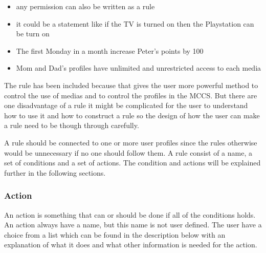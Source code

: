 \begin{itemize}
	\item any permission can also be written as a rule
	\item it could be a statement like if the TV is turned on then the Playstation can be turn on
	\item The first Monday in a month increase Peter's points by 100
	\item Mom and Dad's profiles have unlimited and unrestricted access to each media
\end{itemize}

The rule has been included because that gives the user more powerful method to control the use of medias and to control the profiles in the MCCS.
But there are one disadvantage of a rule it might be complicated for the user to understand how to use it and how to construct a rule so the design of how the user can make a rule need to be though through carefully.

A rule should be connected to one or more user profiles since the rules otherwise would be unnecessary if no one should follow them. A rule consist of a name, a set of conditions and a set of actions. The condition and actions will be explained further in the following sections.

\subsubsection{Action}

An action is something that can or should be done if all of the conditions holds. An action always have a name, but this name is not user defined. The user have a choice from a list which can be found in the description below with an explanation of what it does and what other information is needed for the action.   


